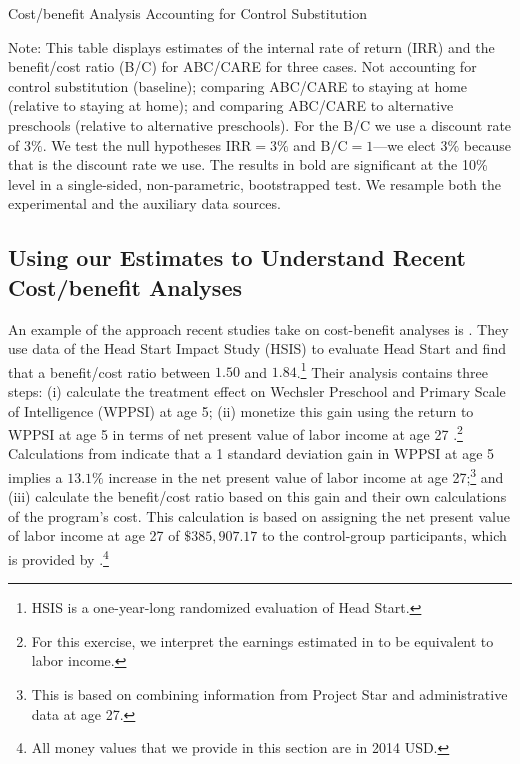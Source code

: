 \begin{table}[!htbp]
\begin{threeparttable}
\caption{Cost/benefit Analysis Accounting for Control Substitution}
\label{table:cbacs}
\centering

\begin{tablenotes}
\footnotesize
\item Note: This table displays estimates of the internal rate of return (IRR) and the benefit/cost ratio (B/C) for ABC/CARE for three cases. Not accounting for control substitution (baseline); comparing ABC/CARE to staying at home (relative to staying at home); and comparing ABC/CARE to alternative preschools (relative to alternative preschools). For the B/C we use a discount rate of $3\%$. We test the null hypotheses $\text{IRR} = 3\%$ and $\text{B/C} = 1$---we elect $3\%$ because that is the discount rate we use. The results in bold are significant at the 10\% level in a single-sided, non-parametric, bootstrapped test. We resample both the experimental and the auxiliary data sources.
\end{tablenotes}
\end{threeparttable}
\end{table}

\subsection{Using our Estimates to Understand Recent Cost/benefit Analyses}

\noindent An example of the approach recent studies take on cost-benefit analyses is \citet{Kline_Walters_2016_QJE}. They use data of the Head Start Impact Study (HSIS) to evaluate Head Start and find that a benefit/cost ratio between $1.50$ and $1.84$.\footnote{HSIS is a one-year-long randomized evaluation of Head Start.} Their analysis contains three steps: (i) calculate the treatment effect on Wechsler Preschool and Primary Scale of Intelligence (WPPSI) at age 5; (ii) monetize this gain using the return to WPPSI at age 5 in terms of net present value of labor income at age 27 \citep{Chetty_Friedman_etal_2011_QJoE}.\footnote{For this exercise, we interpret the earnings estimated in \citet{Chetty_Friedman_etal_2011_QJoE} to be equivalent to labor income.} Calculations from \citet{Chetty_Friedman_etal_2011_QJoE} indicate that a 1 standard deviation gain in WPPSI at age 5 implies a $13.1\%$ increase in the net present value of labor income at age 27;\footnote{This is based on combining information from Project Star and administrative data at age 27.} and (iii) calculate the benefit/cost ratio based on this gain and their own calculations of the program's cost. This calculation is based on assigning the net present value of labor income at age 27 of $\$385,907.17$ to the control-group participants, which is provided by  \citet{Chetty_Friedman_etal_2011_QJoE}.\footnote{All money values that we provide in this section are in 2014 USD.}



